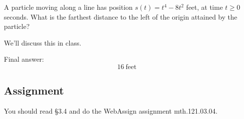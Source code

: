 \documentclass[12pt,addpoints, answers, fleqn]{exam}
\begin{document}
\begin{questions}
\question A particle moving along a line has position $s\left(t\right) = t^4 - 8t^2$ feet, at time 
$t \geq 0$ seconds. What is the farthest distance to the left of the origin attained by the particle?
\begin{solution}
We'll discuss this in class.

Final answer:
\[
16 \ \mbox{feet}
\]
\end{solution}

\end{questions}









\subsection{Assignment}
You should read \S  3.4 and do the WebAssign assignment mth.121.03.04.
\vfill
\pagebreak
\end{document}

